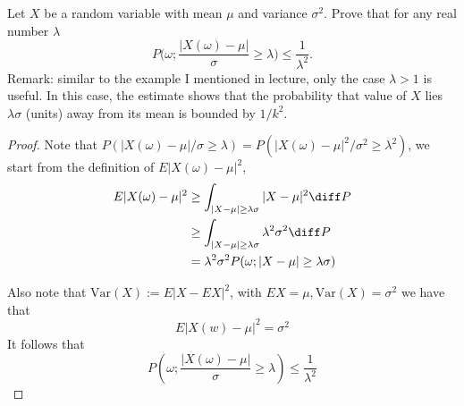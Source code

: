 \problem
\begin{question}
    Let $X$ be a random variable with mean $\mu$ and variance $\sigma^2$.
    Prove that for any real number $\lambda$
    \[P\Big(\omega; \frac{|X(\omega)-\mu|}{\sigma}\geq \lambda\Big)\leq \frac{1}{\lambda^2}.\]
    Remark: similar to the example I mentioned in lecture, only the case $\lambda>1$ is useful.
    In this case, the estimate shows that the probability that value of $X$ lies $\lambda \sigma$
    (units) away from its mean is bounded by $1/k^2$.
\end{question}

    \begin{proof}
        Note that $P(|X(\omega)-\mu|/\sigma\geq\lambda)
        =P(|X(\omega)-\mu|^2/\sigma^2\geq\lambda^2)$,
        we start from the definition of $E|X(\omega)-\mu|^2$,
        \begin{align*}
            E|X(\omega)-\mu|^2
            &\geq\int_{|X-\mu|\geq\lambda\sigma}|X-\mu|^2\diff P\\
            &\geq\int_{|X-\mu|\geq\lambda\sigma}\lambda^2\sigma^2\diff P\\
            &=\lambda^2\sigma^2 P(\omega;|X-\mu|\geq \lambda\sigma)
        \end{align*}

        Also note that $\mathrm{Var}(X):=E|X-EX|^2$,
        with $EX=\mu,\mathrm{Var}(X)=\sigma^2$ we have that
        \[E|X(w)-\mu|^2=\sigma^2\]
        It follows that
        \[P\left(\omega;\frac{|X(\omega)-\mu|}{\sigma}\geq\lambda\right)
        \leq\frac{1}{\lambda^2}\]
    \end{proof}

